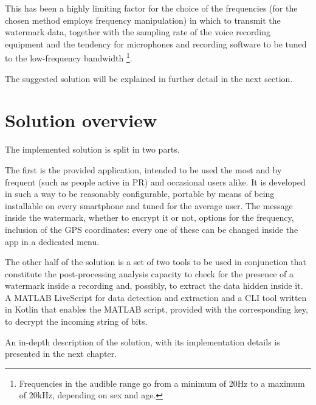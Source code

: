  
This has been a highly limiting factor for the choice of the frequencies (for the chosen method employs frequency manipulation) in which to transmit the watermark data, together with the sampling rate of the voice recording equipment and the tendency for microphones and recording software to be tuned to the low-frequency bandwidth \footnote{Frequencies in the audible range go from a minimum of 20Hz to a maximum of 20kHz, depending on sex and age.}. 


The suggested solution will be explained in further detail in the next section.




\section{Solution overview}
The implemented solution is split in two parts. 



The first is the provided application, intended to be used the most and by frequent (such as people active in PR) and occasional users alike. It is developed in such a way to be reasonably configurable, portable by means of being installable on every smartphone and tuned for the average user. The message inside the watermark, whether to encrypt it or not, options for the frequency, inclusion of the GPS coordinates: every one of these can be changed inside the app in a dedicated menu. 




The other half of the solution is a set of two tools to be used in conjunction that constitute the post-processing analysis capacity to check for the presence of a watermark inside a recording and, possibly, to extract the data hidden inside it. A MATLAB LiveScript for data detection and extraction and a CLI tool written in Kotlin that enables the MATLAB script, provided with the corresponding key, to decrypt the incoming string of bits.


An in-depth description of the solution, with its implementation details is presented in the next chapter.
